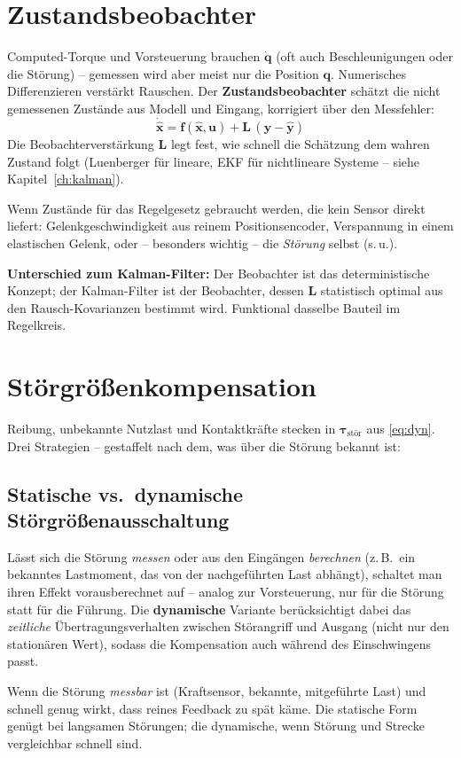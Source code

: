 \section{Zustandsbeobachter}
Computed-Torque und Vorsteuerung brauchen $\dot{\bm{q}}$ (oft auch
Beschleunigungen oder die Störung) -- gemessen wird aber meist nur die Position
$\bm{q}$. Numerisches Differenzieren verstärkt Rauschen. Der
\textbf{Zustandsbeobachter} schätzt die nicht gemessenen Zustände aus Modell und
Eingang, korrigiert über den Messfehler:
\begin{equation}
\dot{\hat{\bm{x}}} = \bm{f}(\hat{\bm{x}},\bm{u})
+ \bm{L}\,(\bm{y} - \hat{\bm{y}})
\end{equation}
Die Beobachterverstärkung $\bm{L}$ legt fest, wie schnell die Schätzung dem
wahren Zustand folgt (Luenberger für lineare, EKF für nichtlineare Systeme --
siehe Kapitel~\ref{ch:kalman}).
\begin{infobox}[title=Wann einsetzen]
Wenn Zustände für das Regelgesetz gebraucht werden, die kein Sensor direkt
liefert: Gelenkgeschwindigkeit aus reinem Positionsencoder, Verspannung in einem
elastischen Gelenk, oder -- besonders wichtig -- die \emph{Störung} selbst (s.\,u.).
\end{infobox}
\textbf{Unterschied zum Kalman-Filter:} Der Beobachter ist das deterministische
Konzept; der Kalman-Filter ist der Beobachter, dessen $\bm{L}$ statistisch
optimal aus den Rausch-Kovarianzen bestimmt wird. Funktional dasselbe Bauteil im
Regelkreis.

\section{Störgrößenkompensation}
Reibung, unbekannte Nutzlast und Kontaktkräfte stecken in
$\bm{\tau}_{\text{stör}}$ aus \eqref{eq:dyn}. Drei Strategien -- gestaffelt nach
dem, was über die Störung bekannt ist:

\subsection{Statische vs.\ dynamische Störgrößenausschaltung}
Lässt sich die Störung \emph{messen} oder aus den Eingängen \emph{berechnen}
(z.\,B.\ ein bekanntes Lastmoment, das von der nachgeführten Last abhängt),
schaltet man ihren Effekt vorausberechnet auf -- analog zur Vorsteuerung, nur für
die Störung statt für die Führung. Die \textbf{dynamische} Variante berücksichtigt
dabei das \emph{zeitliche} Übertragungsverhalten zwischen Störangriff und Ausgang
(nicht nur den stationären Wert), sodass die Kompensation auch während des
Einschwingens passt.
\begin{infobox}[title=Wann einsetzen]
Wenn die Störung \emph{messbar} ist (Kraftsensor, bekannte, mitgeführte Last) und
schnell genug wirkt, dass reines Feedback zu spät käme. Die statische Form genügt
bei langsamen Störungen; die dynamische, wenn Störung und Strecke vergleichbar
schnell sind.
\end{infobox}

